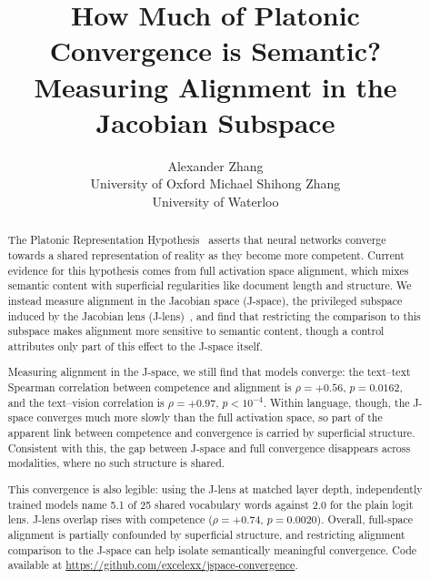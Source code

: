 \documentclass{article}
\title{How Much of Platonic Convergence is Semantic? Measuring Alignment in the Jacobian Subspace}
\author{%
  Alexander Zhang \\
  University of Oxford
  \And
  Michael Shihong Zhang \\
  University of Waterloo
}
\begin{document}
\raggedbottom

\maketitle

\begin{abstract}
  The Platonic Representation Hypothesis~\citep{huh2024platonic} asserts that neural networks converge towards a shared representation of reality as they become more competent. Current evidence for this hypothesis comes from full activation space alignment, which mixes semantic content with superficial regularities like document length and structure. We instead measure alignment in the Jacobian space (J-space), the privileged subspace induced by the Jacobian lens (J-lens)~\citep{gurnee2026verbalizable}, and find that restricting the comparison to this subspace makes alignment more sensitive to semantic content, though a control attributes only part of this effect to the J-space itself.
  
  Measuring alignment in the J-space, we still find that models converge: the text--text Spearman correlation between competence and alignment is $\rho = +0.56$, $p = 0.0162$, and the text--vision correlation is $\rho = +0.97$, $p < 10^{-4}$. Within language, though, the J-space converges much more slowly than the full activation space, so part of the apparent link between competence and convergence is carried by superficial structure. Consistent with this, the gap between J-space and full convergence disappears across modalities, where no such structure is shared.
  
  This convergence is also legible: using the J-lens at matched layer depth, independently trained models name 5.1 of 25 shared vocabulary words against 2.0 for the plain logit lens. J-lens overlap rises with competence ($\rho = +0.74$, $p = 0.0020$). Overall, full-space alignment is partially confounded by superficial structure, and restricting alignment comparison to the J-space can help isolate semantically meaningful convergence. Code available at \url{https://github.com/excelexx/jspace-convergence}.
\end{abstract}
\end{document}
